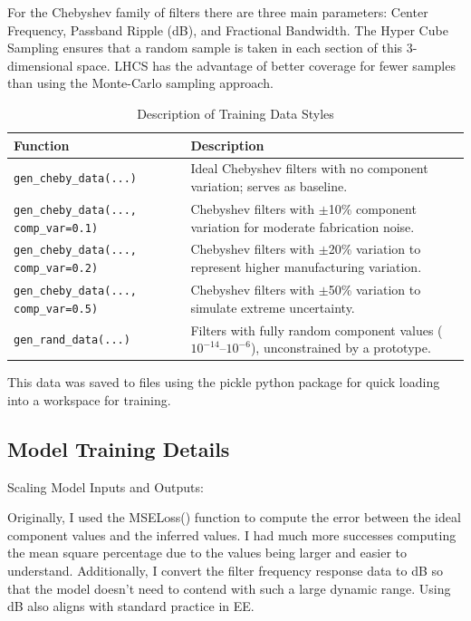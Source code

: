 \documentclass[10pt,conference]{IEEEtran}
\begin{document}
For the Chebyshev family of filters there are three main parameters: Center Frequency, Passband Ripple (dB), and Fractional Bandwidth. The Hyper Cube Sampling ensures that a random sample is taken in each section of this 3-dimensional space. LHCS has the advantage of better coverage for fewer samples than using the Monte-Carlo sampling approach.

\begin{table}[!ht]
\small %
\centering
\caption{Description of Training Data Styles}
\begin{tabular}{@{}p{3.8cm}p{4.2cm}@{}}
\toprule
\textbf{Function} & \textbf{Description} \\ \midrule
\texttt{gen\_cheby\_data(...)} & Ideal Chebyshev filters with no component variation; serves as baseline. \\
\texttt{gen\_cheby\_data(..., comp\_var=0.1)} & Chebyshev filters with $\pm$10\% component variation for moderate fabrication noise. \\
\texttt{gen\_cheby\_data(..., comp\_var=0.2)} & Chebyshev filters with $\pm$20\% variation to represent higher manufacturing variation. \\
\texttt{gen\_cheby\_data(..., comp\_var=0.5)} & Chebyshev filters with $\pm$50\% variation to simulate extreme uncertainty. \\
\texttt{gen\_rand\_data(...)} & Filters with fully random component values ($10^{-14}$–$10^{-6}$), unconstrained by a prototype. \\
\bottomrule
\end{tabular}
\label{tab:training_data_styles}
\end{table}


This data was saved to files using the pickle python package for quick loading into a workspace for training.






\subsection{Model Training Details}


Scaling Model Inputs and Outputs:

Originally, I used the MSELoss() function to compute the error between the ideal component values and the inferred values. I had much more successes computing the mean square percentage due to the values being larger and easier to understand. Additionally, I convert the filter frequency response data to dB so that the model doesn't need to contend with such a large dynamic range. Using dB also aligns with standard practice in EE.
\end{document}
